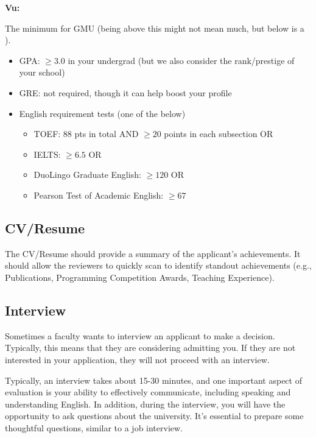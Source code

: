 \documentclass[11pt]{article}
\newenvironment{commentbox}[1][]{
\small
    \begin{mybox}
    {\small \textbf{#1}}
 }{
   \end{mybox}
}
\newcommand{\red}[1]{{\color{red}{#1}}}
\begin{document}
\begin{commentbox}[Vu:]
The minimum for GMU (being above this might not mean much, but below is a \red{red flag}).
\begin{itemize}
\item GPA: $\ge 3.0$ in your undergrad (but we also consider the rank/prestige of your school)
\item GRE: not required, though it can help boost your profile
\item English requirement tests (one of the below)
  \begin{itemize}    
  \item TOEF: 88 pts in total AND $\ge 20$ points in each subsection OR
  \item IELTS: $\ge 6.5$ OR
  \item DuoLingo Graduate English: $\ge 120$ OR 
  \item Pearson Test of Academic English: $\ge 67$
  \end{itemize}  
\end{itemize}
\end{commentbox}


\subsection{CV/Resume}
The CV/Resume should provide a summary of the applicant's achievements.  It should allow the reviewers to quickly scan to identify standout achievements (e.g., Publications, Programming Competition Awards, Teaching Experience).

\subsection{Interview}
Sometimes a faculty wants to interview an applicant to make a decision. Typically, this means that they are considering admitting you. If they are not interested in your application, they will not proceed with an interview. 

Typically, an interview takes about 15-30 minutes, and one important aspect of evaluation is your ability to effectively communicate, including speaking and understanding English. In addition, during the interview, you will have the opportunity to ask questions about the university. It's essential to prepare some thoughtful questions, similar to a job interview.
\end{document}
